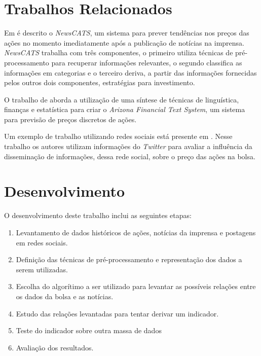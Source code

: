 \documentclass[twoside]{article}
\begin{document}
\begin{multicols}{2}

\section{Trabalhos Relacionados}

Em \cite{Mittermayer:2004} é descrito o \emph{NewsCATS}, um sistema para prever tendências nos preços das ações no momento imediatamente após a publicação de notícias na imprensa. \emph{NewsCATS} trabalha com três componentes, o primeiro utiliza técnicas de pré-processamento para recuperar informações relevantes, o segundo classifica as informações em categorias e o terceiro deriva, a partir das informações fornecidas pelos outros dois componentes, estratégias para investimento.

O trabalho de \cite{SchumakerChen:2010} aborda a utilização de uma síntese de técnicas de linguística, finanças e estatística para criar o \emph{Arizona Financial Text System}, um sistema para previsão de preços discretos de ações.

Um exemplo de trabalho utilizando redes sociais está presente em \cite{SulDennisYuan:2014}. Nesse trabalho os autores utilizam informações do \emph{Twitter} para avaliar a influência da disseminação de informações, dessa rede social, sobre o preço das ações na bolsa.



\section{Desenvolvimento}

O desenvolvimento deste trabalho inclui as seguintes etapas:
\begin{enumerate}
\item Levantamento de dados históricos de ações, notícias da imprensa e postagens em redes sociais.
\item Definição das técnicas de pré-processamento e representação dos dados a serem utilizadas.
\item Escolha do algorítimo a ser utilizado para levantar as possíveis relações entre os dados da bolsa e as notícias.
\item Estudo das relações levantadas para tentar derivar um indicador.
\item Teste do indicador sobre outra massa de dados
\item Avaliação dos resultados.
\end{enumerate}



\end{multicols}
\end{document}
